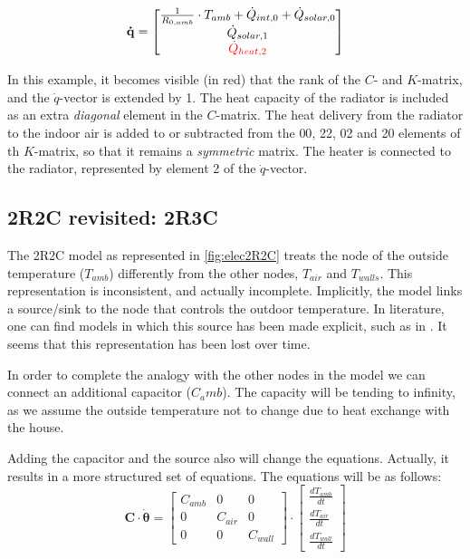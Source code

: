 \begin{equation}
	\mathbf{\dot{q}} =
	\begin{bmatrix}
		\frac{1}{R_{0, amb}} \cdot T_{amb} + \dot{Q}_{int, 0} + \dot{Q}_{solar, 0} \\
		\dot{Q}_{solar, 1} \\
		\color{red} \dot{Q}_{heat, 2}
	\end{bmatrix}
\end{equation}

In this example, it becomes visible (in red) that the rank of the $C$- and $K$-matrix, and the $\dot{q}$-vector is extended by 1. The heat capacity of the radiator is included as an extra \emph{diagonal} element in the $C$-matrix. The heat delivery from the radiator to the indoor air is added to or subtracted from the {00}, {22}, {02} and {20} elements of th $K$-matrix, so that it remains a \emph{symmetric} matrix. The heater is connected to the radiator, represented by element {2} of the $\dot{q}$-vector. 

\subsection{2R2C revisited: 2R3C}
The 2R2C model as represented in \ref{fig:elec2R2C} treats the node of the outside temperature ($T_{amb}$) differently from the other nodes, $T_{air}$ and $T_{walls}$.  This representation is inconsistent, and actually incomplete. Implicitly, the model links a source/sink to the node that controls the outdoor temperature. In literature, one can find models in which this source has been made explicit, such as in \cite{achterbos}. It seems that this representation has been lost over time. 

In order to complete the analogy with the other nodes in the model we can connect an additional capacitor ($C_amb$). The capacity will be tending to infinity, as we assume the outside temperature not to change due to heat exchange with the house.


Adding the capacitor and the source also will change the equations. Actually, it results in a more structured set of equations. The equations will be as follows:
\begin{equation}
	\mathbf{C} \cdot \boldsymbol{\dot{\theta}} =
	\begin{bmatrix}
		C_{amb} & 0 & 0\\
		0 &  C_{air} & 0   \\
		0 & 0 & C_{wall} 
	\end{bmatrix}
	\cdot
	\begin{bmatrix}
		\frac{dT_{amb}}{dt} \\
		\frac{dT_{air}}{dt} \\
		\frac{dT_{wall}}{dt} 
	\end{bmatrix}
\end{equation}

